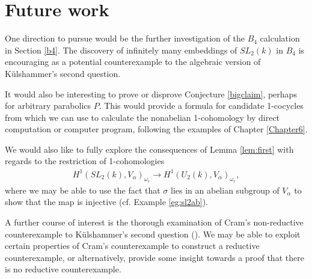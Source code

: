 
\chapter{Future work}
\label{Chapter7}

One direction to pursue would be the further investigation of the $B_4$ calculation in Section \ref{b4}. The discovery of infinitely many embeddings of $SL_2(k)$ in $B_4$ is encouraging as a potential counterexample to the algebraic version of K\"ulshammer's second question.

It would also be interesting to prove or disprove Conjecture \ref{bigclaim}, perhaps for arbitrary parabolics $P$. This would provide a formula for candidate 1-cocycles from which we can use to calculate the nonabelian 1-cohomology by direct computation or computer program, following the examples of Chapter \ref{Chapter6}.

We would also like to fully explore the consequences of Lemma \ref{lem:first} with regards to the restriction of 1-cohomologies
\begin{align*}
H^1(SL_2(k), V_\alpha)_{\omega_r} \rightarrow H^1(U_2(k), V_\alpha)_{\omega_r},
\end{align*}
where we may be able to use the fact that $\sigma$ lies in an abelian subgroup of $V_\alpha$ to show that the map is injective (cf. Example \ref{eg:sl2ab}).

A further course of interest is the thorough examination of Cram's non-reductive counterexample to K\"ulshammer's second question (\cite[Appendix]{slodowy1997two}). We may be able to exploit certain properties of Cram's counterexample to construct a reductive counterexample, or alternatively, provide some insight towards a proof that there is no reductive counterexample.
